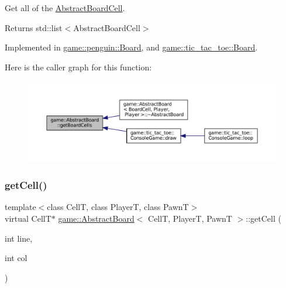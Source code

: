 Get all of the \hyperlink{classgame_1_1_abstract_board_cell}{Abstract\+Board\+Cell}. 

\begin{DoxyReturn}{Returns}
std\+::list$<$\+Abstract\+Board\+Cell$>$ 
\end{DoxyReturn}


Implemented in \hyperlink{classgame_1_1penguin_1_1_board_afae3ac9e82200303d28dd4cf7bfa12ec}{game\+::penguin\+::\+Board}, and \hyperlink{classgame_1_1tic__tac__toe_1_1_board_af8bc9dc8a2cfed68aa7d9adead27594e}{game\+::tic\+\_\+tac\+\_\+toe\+::\+Board}.

Here is the caller graph for this function\+:
\nopagebreak
\begin{figure}[H]
\begin{center}
\leavevmode
\includegraphics[width=350pt]{classgame_1_1_abstract_board_a73d6bef66826688cd6e2bc0f37acb4b0_icgraph}
\end{center}
\end{figure}
\mbox{\label{classgame_1_1_abstract_board_af02030d0ae3f44b95fff7c8012e7a066}} 
\subsubsection{\texorpdfstring{get\+Cell()}{getCell()}}
{\footnotesize\ttfamily template$<$class CellT, class PlayerT, class PawnT$>$ \\
virtual CellT$\ast$ \hyperlink{classgame_1_1_abstract_board}{game\+::\+Abstract\+Board}$<$ CellT, PlayerT, PawnT $>$\+::get\+Cell (\begin{DoxyParamCaption}\item[{int}]{line,  }\item[{int}]{col }\end{DoxyParamCaption})\hspace{0.3cm}{\ttfamily [pure virtual]}}



